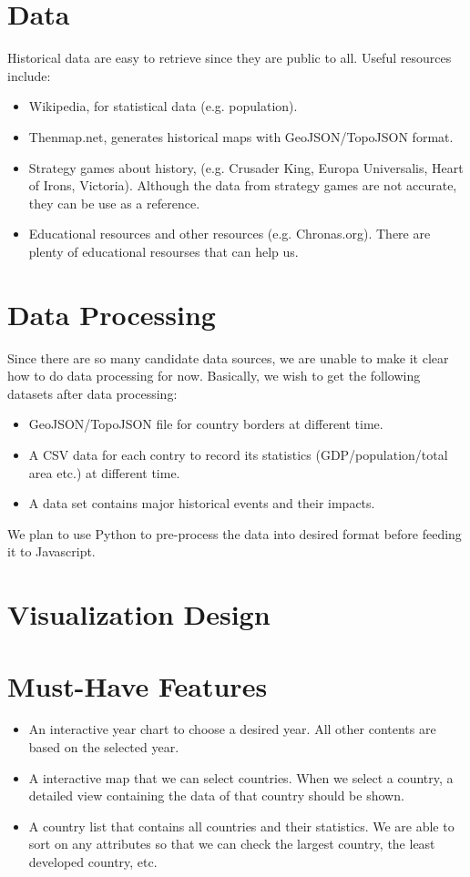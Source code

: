 \documentclass[12pt, fullpage,letterpaper]{article}
\begin{document}
\section{Data}
Historical data are easy to retrieve since they are public to all. Useful resources include:
\begin{itemize}
    \item Wikipedia, for statistical data (e.g. population).
    \item Thenmap.net, generates historical maps with GeoJSON/TopoJSON format.
    \item Strategy games about history, (e.g. Crusader King, Europa Universalis, Heart of Irons, Victoria). Although the data from strategy games are not accurate, they can be use
        as a reference.
    \item Educational resources and other resources (e.g. Chronas.org). There are plenty of educational resourses that can help us.
\end{itemize}

\section{Data Processing}
Since there are so many candidate data sources, we are unable to make it clear how to do data processing for now.
Basically, we wish to get the following datasets after data processing:
\begin{itemize}
    \item GeoJSON/TopoJSON file for country borders at different time.
    \item A CSV data for each contry to record its statistics (GDP/population/total area etc.) at different time.
    \item A data set contains major historical events and their impacts.
\end{itemize}

We plan to use Python to pre-process the data into desired format before feeding it to Javascript.

\section{Visualization Design}

\section{Must-Have Features}
\begin{itemize}
    \item An interactive year chart to choose a desired year. All other contents are based on the selected year.
    \item A interactive map that we can select countries. When we select a country, a detailed view containing the data of that country should be shown.
    \item A country list that contains all countries and their statistics. We are able to sort on any attributes so that we can check the largest country, the least developed country, etc.
\end{itemize}
\end{document}
